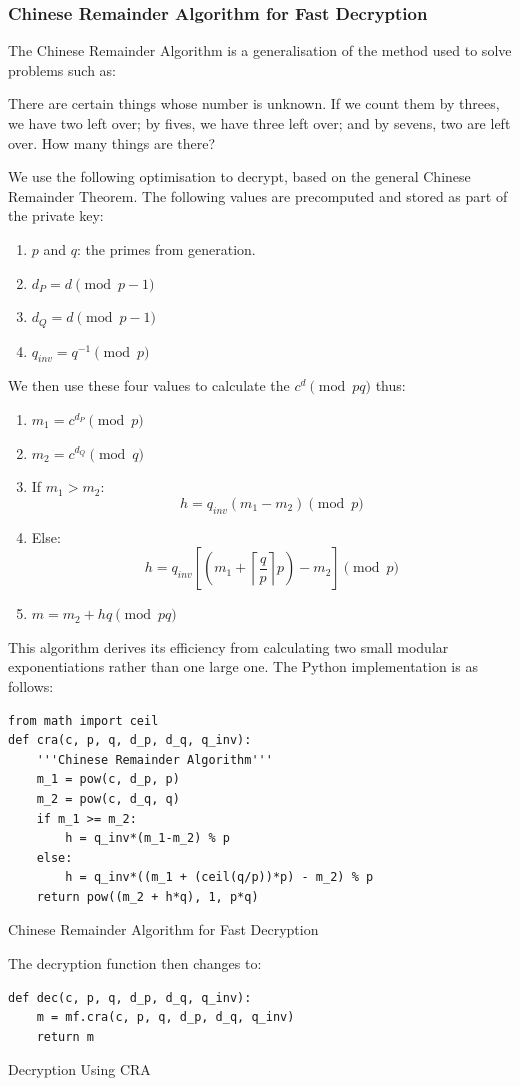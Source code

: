 \documentclass[titlepage]{article}
\newenvironment{longlisting}{\captionsetup{type=listing}}{}
\begin{document}
\subsubsection{Chinese Remainder Algorithm for Fast Decryption}
The Chinese Remainder Algorithm is a generalisation of the method used to solve problems such as:
\begin{displayquote}
There are certain things whose number is unknown. If we count them by threes, we have two left over;
by fives, we have three left over; and by sevens, two are left over. How many things are there?
\end{displayquote}
We use the following optimisation to decrypt, based on the general Chinese Remainder Theorem. The
following values are precomputed and stored as part of the private key:
\begin{enumerate}
\item $p$ and $q$: the primes from generation.
\item $d_P = d \pmod{p-1}$
\item $d_Q = d \pmod{p-1}$
\item $q_{inv} = q^{-1} \pmod{p}$
\end{enumerate}

We then use these four values to calculate the $c^d \pmod{pq}$ thus:
\begin{enumerate}
\item $m_1 = c^{d_P} \pmod{p}$
\item $m_2 = c^{d_Q} \pmod{q}$
\item If $m_1 > m_2$: $$h = q_{inv}(m_1 - m_2) \pmod{p}$$
\item Else: $$h = q_{inv}[(m_1 + \left \lceil{\frac{q}{p}}\right \rceil p) - m_2] \pmod{p}$$
\item $m = m_2 + hq \pmod{pq}$
\end{enumerate}

This algorithm derives its efficiency from calculating two small modular exponentiations rather than
one large one. The Python implementation is as follows:
\begin{longlisting}
\begin{verbatim}
from math import ceil
def cra(c, p, q, d_p, d_q, q_inv):
    '''Chinese Remainder Algorithm'''
    m_1 = pow(c, d_p, p)
    m_2 = pow(c, d_q, q)
    if m_1 >= m_2:
        h = q_inv*(m_1-m_2) % p
    else:
        h = q_inv*((m_1 + (ceil(q/p))*p) - m_2) % p
    return pow((m_2 + h*q), 1, p*q)
\end{verbatim}
\caption{Chinese Remainder Algorithm for Fast Decryption}
\end{longlisting}
The decryption function then changes to:
\begin{longlisting}
\begin{verbatim}
def dec(c, p, q, d_p, d_q, q_inv):
    m = mf.cra(c, p, q, d_p, d_q, q_inv)
    return m
\end{verbatim}
\caption{Decryption Using CRA}
\end{longlisting}
\end{document}
